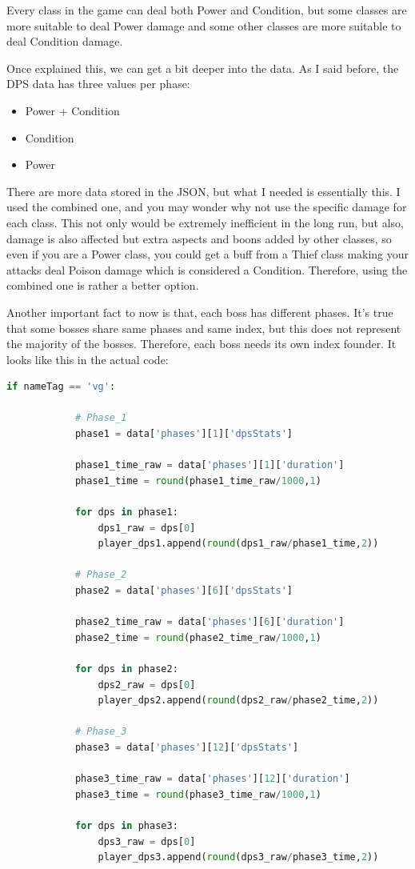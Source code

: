 \documentclass[12pt,a4paper]{article}
\begin{document}
    Every class in the game can deal both Power and Condition, but some classes are more suitable to deal Power
    damage and some other classes are more suitable to deal Condition damage.

    Once explained this, we can get a bit deeper into the data. As I said before, the DPS data has three values
    per phase:
    \begin{itemize}
        \item Power + Condition
        \item Condition
        \item Power
    \end{itemize} 

    There are more data stored in the JSON, but what I needed is essentially this. I used the combined one, and
    you may wonder why not use the specific damage for each class. This not only would be extremely inefficient in
    the long run, but also, damage is also affected but extra aspects and boons added by other classes, so even if
    you are a Power class, you could get a buff from a Thief class making your attacks deal Poison damage which is 
    considered a Condition. Therefore, using the combined one is rather a better option.

    \newpage

    Another important fact to now is that, each boss has different phases. It's true that some bosses share same phases
    and same index, but this does not represent the majority of the bosses. Therefore, each boss needs its own index
    founder. It looks like this in the actual code:

    \begin{lstlisting}[language=Python]
    if nameTag == 'vg':

            # Phase_1
            phase1 = data['phases'][1]['dpsStats']

            phase1_time_raw = data['phases'][1]['duration']
            phase1_time = round(phase1_time_raw/1000,1)

            for dps in phase1:
                dps1_raw = dps[0]
                player_dps1.append(round(dps1_raw/phase1_time,2))

            # Phase_2
            phase2 = data['phases'][6]['dpsStats']

            phase2_time_raw = data['phases'][6]['duration']
            phase2_time = round(phase2_time_raw/1000,1)

            for dps in phase2:
                dps2_raw = dps[0]
                player_dps2.append(round(dps2_raw/phase2_time,2))

            # Phase_3
            phase3 = data['phases'][12]['dpsStats']

            phase3_time_raw = data['phases'][12]['duration']
            phase3_time = round(phase3_time_raw/1000,1)

            for dps in phase3:
                dps3_raw = dps[0]
                player_dps3.append(round(dps3_raw/phase3_time,2))
    \end{lstlisting}
\end{document}
